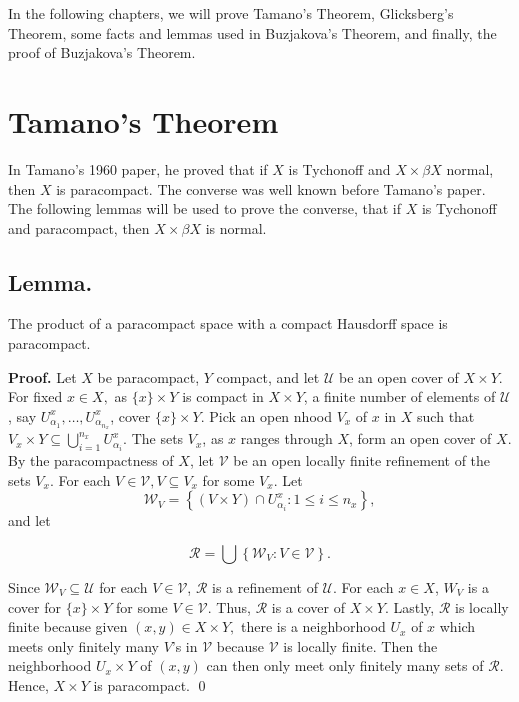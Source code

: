 \documentclass{article}
\begin{document}
	  \vskip 15pt
	  In the following chapters, we will prove Tamano's Theorem, Glicksberg's Theorem, some facts and lemmas used in Buzjakova's Theorem, and finally, the proof of Buzjakova's Theorem. 






	  \newpage





	  \section{Tamano's Theorem}



	  \vskip 20pt

	  In Tamano's 1960 paper, he proved that if $X$ is Tychonoff and $X\times \beta X$ normal, then $X$ is paracompact. The converse was well known before Tamano's paper. The following lemmas will be used to prove the converse, that if $X$ is Tychonoff and paracompact, then $X\times \beta X$ is normal.

	  \vskip 20pt

	  \subsection{Lemma.} The product of a paracompact space with a compact Hausdorff space is paracompact.

	  \vskip 10pt

	  \textbf{Proof.} Let $X$ be paracompact, $Y$ compact, and let $\mathcal{U}$ be an open cover of $X\times Y$. For fixed $x\in X,$ as $\{x\}\times Y$ is compact in $X\times Y$, a finite number of elements of $\mathcal{U}$, say $U_{\alpha_1}^x, \dots , U_{\alpha_{n_x}}^x$, cover $\{x\}\times Y$. Pick an open nhood $V_x$ of $x$ in $X$ such that $V_x\times Y\subseteq \bigcup_{i=1}^{n_x} U_{\alpha_i}^x.$ 
	  \vskip 10pt
	  The sets $V_x$, as $x$ ranges through $X$, form an open cover of $X$. By the paracompactness of $X$, let $\mathcal{V}$ be an open locally finite refinement of the sets $V_x$. For each $V\in \mathcal{V}, V\subseteq V_x$ for some $V_x$. 
	  Let $$\mathcal{W}_V=\left\{(V\times Y)\cap U_{\alpha_i}^x: 1\leq i\leq n_x\right\},$$ and let 

	  $$\mathcal{R}=\bigcup \left\{\mathcal{W}_V: V\in \mathcal{V}\right\}.$$

	  \vskip 5pt

	  Since $\mathcal{W}_V\subseteq \mathcal{U}$ for each $V\in \mathcal{V}$, $\mathcal{R}$ is a refinement of $\mathcal{U}$. For each $x\in X$, $W_V$ is a cover for $\{x\}\times Y$ for some $V\in \mathcal{V}$. Thus, $\mathcal{R}$ is a cover of $X\times Y$. Lastly, $\mathcal{R}$ is locally finite because given $(x,y)\in X\times Y,$ there is a neighborhood $U_x$ of $x$ which meets only finitely many $V$'s in $\mathcal{V}$ because $\mathcal{V}$ is locally finite. Then the neighborhood $U_x\times Y$ of $(x,y)$ can then only meet only finitely many sets of $\mathcal{R}$. Hence, $X\times Y$ is paracompact.  \qed
\end{document}
